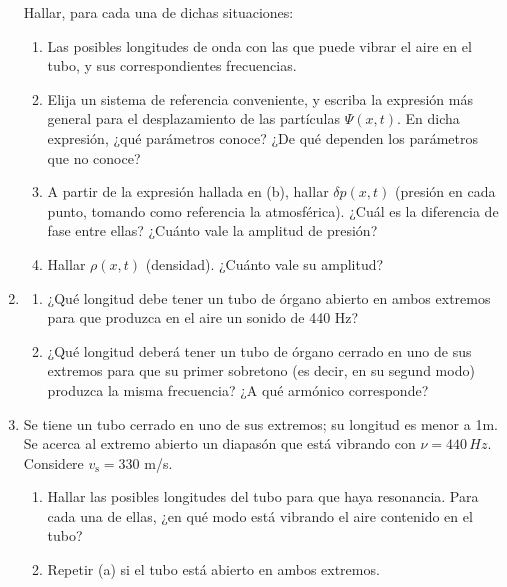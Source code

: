 \documentclass[11pt,spanish]{article}
\begin{document}
\begin{enumerate}
    Hallar, para cada una de dichas situaciones: 

    \begin{enumerate}
        \item Las posibles longitudes de onda con las que puede vibrar el aire
        en el tubo, y sus correspondientes frecuencias.

        \item Elija un sistema de referencia conveniente, y escriba la expresión
        más general para el desplazamiento de las partículas $\Psi(x,t)$. En
        dicha expresión, ¿qué parámetros conoce? ¿De qué dependen los parámetros
        que no conoce?

        \item A partir de la expresión hallada en (b), hallar $\delta p(x,t)$
        (presión en cada punto, tomando como referencia la atmosférica). ¿Cuál
        es la diferencia de fase entre ellas? ¿Cuánto vale la amplitud de
        presión?

        \item Hallar $\rho(x,t)$ (densidad). ¿Cuánto vale su amplitud?
    \end{enumerate}


    \item
    \begin{enumerate}
        \item ¿Qué longitud debe tener un tubo de órgano abierto en ambos
        extremos para que produzca en el aire un sonido de 440 Hz?

        \item ¿Qué longitud deberá tener un tubo de órgano cerrado en uno de sus
        extremos para que su primer sobretono (es decir, en su segund modo)
        produzca la misma frecuencia? ¿A qué armónico corresponde?
    \end{enumerate}


    \item Se tiene un tubo cerrado en uno de sus extremos; su longitud es menor
    a 1m. Se acerca al extremo abierto un diapasón que está vibrando con
    $\nu=440\unit{\, Hz}$. Considere $v_\text{s}=330$ m/s.

    \begin{enumerate}
        \item Hallar las posibles longitudes del tubo para que haya resonancia.
        Para cada una de ellas, ¿en qué modo está vibrando el aire contenido en
        el tubo? 
        \item Repetir (a) si el tubo está abierto en ambos extremos.
    \end{enumerate}


\end{enumerate}
\end{document}
